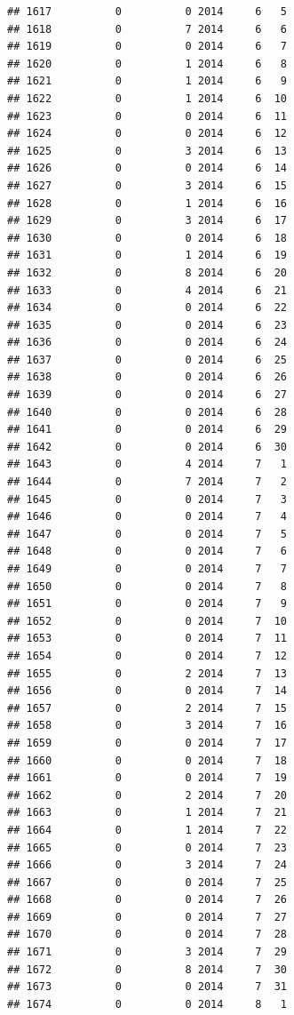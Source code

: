 \documentclass[
]{article}
\begin{document}
\begin{verbatim}
## 1617          0          0 2014     6   5
## 1618          0          7 2014     6   6
## 1619          0          0 2014     6   7
## 1620          0          1 2014     6   8
## 1621          0          1 2014     6   9
## 1622          0          1 2014     6  10
## 1623          0          0 2014     6  11
## 1624          0          0 2014     6  12
## 1625          0          3 2014     6  13
## 1626          0          0 2014     6  14
## 1627          0          3 2014     6  15
## 1628          0          1 2014     6  16
## 1629          0          3 2014     6  17
## 1630          0          0 2014     6  18
## 1631          0          1 2014     6  19
## 1632          0          8 2014     6  20
## 1633          0          4 2014     6  21
## 1634          0          0 2014     6  22
## 1635          0          0 2014     6  23
## 1636          0          0 2014     6  24
## 1637          0          0 2014     6  25
## 1638          0          0 2014     6  26
## 1639          0          0 2014     6  27
## 1640          0          0 2014     6  28
## 1641          0          0 2014     6  29
## 1642          0          0 2014     6  30
## 1643          0          4 2014     7   1
## 1644          0          7 2014     7   2
## 1645          0          0 2014     7   3
## 1646          0          0 2014     7   4
## 1647          0          0 2014     7   5
## 1648          0          0 2014     7   6
## 1649          0          0 2014     7   7
## 1650          0          0 2014     7   8
## 1651          0          0 2014     7   9
## 1652          0          0 2014     7  10
## 1653          0          0 2014     7  11
## 1654          0          0 2014     7  12
## 1655          0          2 2014     7  13
## 1656          0          0 2014     7  14
## 1657          0          2 2014     7  15
## 1658          0          3 2014     7  16
## 1659          0          0 2014     7  17
## 1660          0          0 2014     7  18
## 1661          0          0 2014     7  19
## 1662          0          2 2014     7  20
## 1663          0          1 2014     7  21
## 1664          0          1 2014     7  22
## 1665          0          0 2014     7  23
## 1666          0          3 2014     7  24
## 1667          0          0 2014     7  25
## 1668          0          0 2014     7  26
## 1669          0          0 2014     7  27
## 1670          0          0 2014     7  28
## 1671          0          3 2014     7  29
## 1672          0          8 2014     7  30
## 1673          0          0 2014     7  31
## 1674          0          0 2014     8   1

\end{verbatim}
\end{document}
